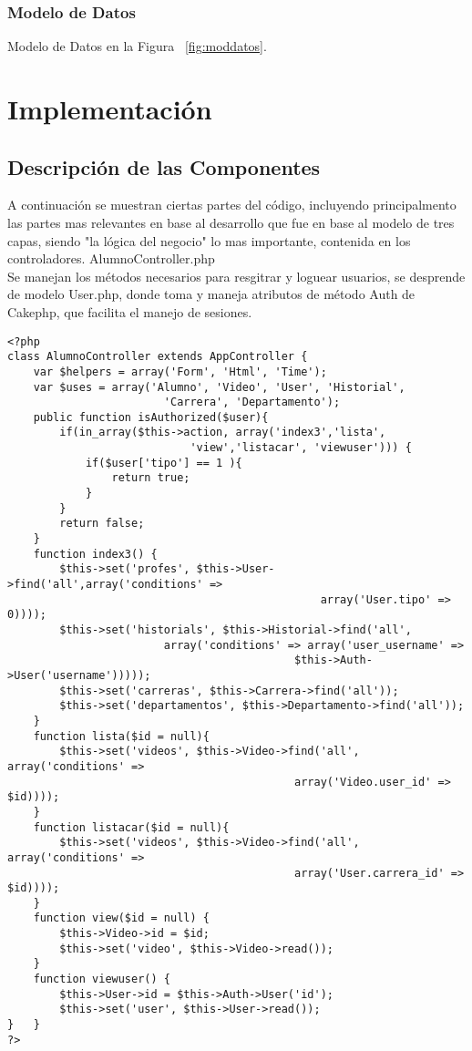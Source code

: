 \documentclass[12pt]{article}
\begin{document}
\subsubsection{Modelo de Datos}
Modelo de Datos en la Figura ~\ref{fig:moddatos}.



\newpage
\section{Implementación}
\subsection{Descripción de las Componentes}
A continuación se muestran ciertas partes del código, incluyendo principalmento las partes mas relevantes en base 
al desarrollo que fue en base al modelo de tres capas, siendo "la lógica del negocio" lo mas importante, contenida
en los controladores.
\newpage
AlumnoController.php\\
Se manejan los métodos necesarios para resgitrar y loguear usuarios, se desprende de modelo User.php, donde toma y maneja atributos de método Auth de Cakephp, que facilita el manejo de sesiones.
\footnotesize
\begin{verbatim}
<?php
class AlumnoController extends AppController {
	var $helpers = array('Form', 'Html', 'Time');
    var $uses = array('Alumno', 'Video', 'User', 'Historial', 
						'Carrera', 'Departamento');
    public function isAuthorized($user){
	    if(in_array($this->action, array('index3','lista', 
							'view','listacar', 'viewuser'))) {
		    if($user['tipo'] == 1 ){
				return true;
			}
		}
        return false;
    }
	function index3() {
		$this->set('profes', $this->User->find('all',array('conditions' => 
												array('User.tipo' => 0))));
		$this->set('historials', $this->Historial->find('all',
						array('conditions' => array('user_username' => 
											$this->Auth->User('username')))));
		$this->set('carreras', $this->Carrera->find('all'));
		$this->set('departamentos', $this->Departamento->find('all'));
	}
	function lista($id = null){
		$this->set('videos', $this->Video->find('all', array('conditions' => 
											array('Video.user_id' => $id))));
    }
	function listacar($id = null){
		$this->set('videos', $this->Video->find('all', array('conditions' => 
											array('User.carrera_id' => $id))));
    }
	function view($id = null) {
		$this->Video->id = $id;
		$this->set('video', $this->Video->read());
	}
	function viewuser() {
	    $this->User->id = $this->Auth->User('id');
	    $this->set('user', $this->User->read());
}	}
?>
\end{verbatim}
\end{document}
